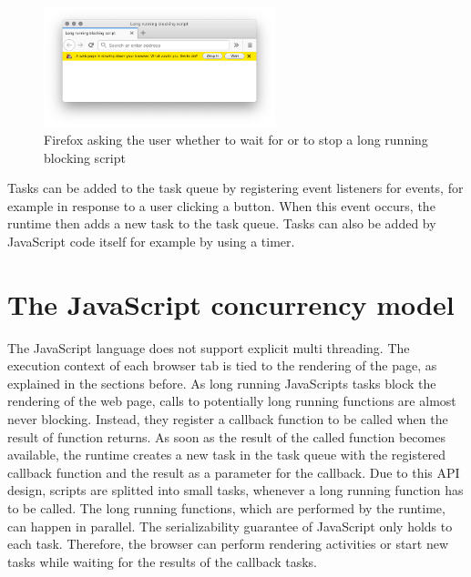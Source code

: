 \documentclass[
	ruledheaders=section,%
	class=report,%
	thesis={type=bachelor},%
	accentcolor=9c,%
	custommargins=true,%
	marginpar=false,%
	parskip=half-,%
	fontsize=11pt,%
]{tudapub}
\begin{document}
  \begin{figure}
    \centering
    \includegraphics[width=0.6\textwidth]{images/blocking-script.png}
    \caption{Firefox asking the user whether to wait for or to stop a long running blocking script}
    \label{fig:blocking-script}
  \end{figure}

  Tasks can be added to the task queue by registering event listeners for events, for example in response to a user clicking a button. When this event occurs, the runtime then adds a new task to the task queue. Tasks can also be added by JavaScript code itself for example by using a timer.
  
  \section{The JavaScript concurrency model}
  
  The JavaScript language does not support explicit multi threading. The execution context of each browser tab is tied to the rendering of the page, as explained in the sections before. As long running JavaScripts tasks block the rendering of the web page, calls to potentially long running functions are almost never blocking. Instead, they register a callback function to be called when the result of function returns. As soon as the result of the called function becomes available, the runtime creates a new task in the task queue with the registered callback function and the result as a parameter for the callback. Due to this API design, scripts are splitted into small tasks, whenever a long running function has to be called. The long running functions, which are performed by the runtime, can happen in parallel. The serializability guarantee of JavaScript only holds to each task. Therefore, the browser can perform rendering activities or start new tasks while waiting for the results of the callback tasks.
\end{document}
